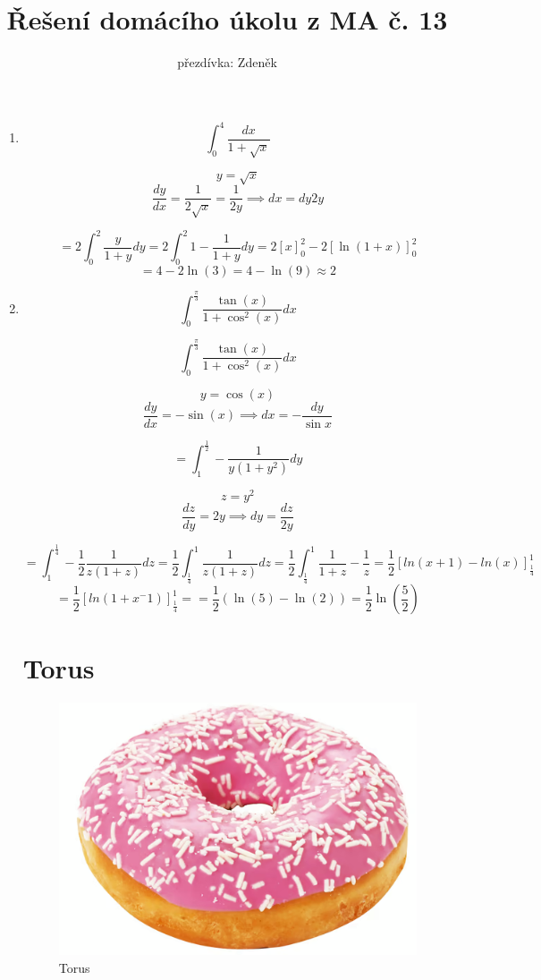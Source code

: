 \documentclass[10pt,a4paper]{article}
\title{Řešení domácího úkolu z MA č. 13}
\author{přezdívka: Zdeněk}
\date{}
\theoremstyle{plain}
\theoremstyle{definition}
\begin{document}
\maketitle

\section{}


\begin{enumerate}[label=(\alph*)]

\item 

\[ \int_0^4 \frac{dx}{1+\sqrt{x}} \]

\[ y = \sqrt{x}\]
\[ \frac{dy}{dx} =\frac{1}{2\sqrt{x}} = \frac1{2y} \implies dx =  dy 2y \]

\[ = 2 \int_0^2 \frac{y}{1+y} dy = 2 \int_0^2 1 - \frac{1}{1+y} dy  = 2 [x]_0^2 - 2[\ln(1+x)]_0^2 \]
\[ = 4 - 2 \ln(3) = 4 - \ln(9) \approx 2\]

\item

\[ \int_0^{\frac{\pi}{3}} \frac{\tan(x) }{1 + \cos^2(x) } dx  \]


\[
\int_0^{\frac{\pi}{3}} \frac{\tan(x) }{1 + \cos^2(x)} dx
\]

\[ y = \cos(x) \]
\[ \frac{dy}{dx} = - \sin(x) \implies dx = -\frac{dy}{\sin x}\]

\[
= \int_1^{\frac12} - \frac{1}{y(1 + y^2)} dy
\]

\[ z = y^2 \]
\[\frac{dz}{dy} = 2y \implies dy = \frac{dz}{2y}  \]


\[
= \int_1^{\frac14} - \frac12 \frac{1}{z(1 + z)} dz
= \frac12 \int_{\frac14}^1  \frac{1}{z(1 + z)} dz
= \frac12 \int_{\frac14}^1  \frac{1}{1 + z} - \frac{1}{z} 
= \frac12 [ln(x+1) - ln(x)]_{\frac14}^1 \]\[
=\frac12 [ln(1+x^-1)]_{\frac14}^1 
= = \frac12 \left( \ln(5) - \ln(2) \right) = \frac12 \ln\left( \frac52 \right)
\]

\section{Torus}

\begin{figure}[hbtp]

\centering
\includegraphics[scale=0.2]{torus.png}
\caption{Torus}
\end{figure}



\end{enumerate}
\end{document}
